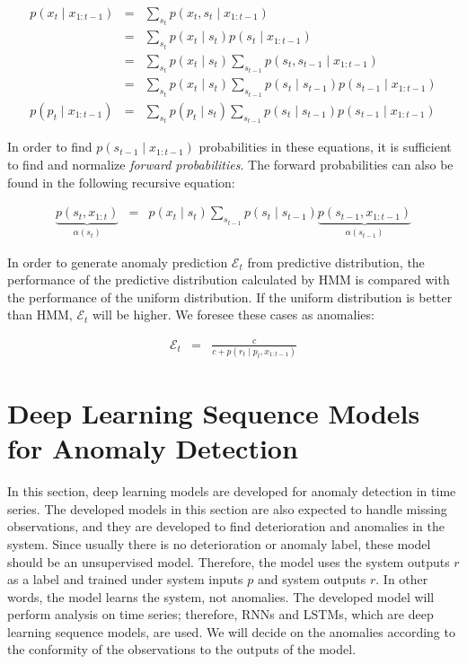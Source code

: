 \begin{eqnarray}
p\left(x_{t} \mid x_{1:t-1}\right) 
& = & \sum_{s_t} p\left(x_t,s_t \mid x_{1:t-1}\right) \\
& = & \sum_{s_t} p\left(x_t \mid s_t\right) p\left(s_t \mid x_{1:t-1}\right) \\
& = & \sum_{s_t} p\left(x_t \mid s_t\right) \sum_{s_{t-1}} p\left(s_t, s_{t-1} \mid x_{1:t-1}\right) \\
& = & \sum_{s_t} p\left(x_t \mid s_t\right) \sum_{s_{t-1}} p\left(s_t \mid s_{t-1}\right) p\left(s_{t-1} \mid x_{1:t-1}\right) \\
p\left(p_{t} \mid x_{1:t-1}\right) 
& = & \sum_{s_t} p\left(p_t \mid s_t\right) \sum_{s_{t-1}} p\left(s_t \mid s_{t-1}\right) p\left(s_{t-1} \mid x_{1:t-1}\right)
\end{eqnarray}

In order to find $ p \left(s_ {t-1} \mid x_ {1: t-1}\right) $ probabilities in these equations, it is sufficient to find and normalize \textit{forward probabilities}. The forward probabilities can also be found in the following recursive equation:

\begin{eqnarray}
\underbrace{p\left(s_t, x_{1:t}\right)}_{\alpha(s_t)} & = & p\left(x_t \mid s_{t}\right) \sum_{s_{t-1}} p\left(s_t \mid s_{t-1}\right) \underbrace{p\left(s_{t-1}, x_{1:t-1}\right)}_{\alpha\left(s_{t-1}\right)}
\end{eqnarray}

In order to generate anomaly prediction $\mathcal{E}_t$ from predictive distribution, the performance of the predictive distribution calculated by HMM is compared with the performance of the uniform distribution. If the uniform distribution is better than HMM, $\mathcal{E}_t$ will be higher. We foresee these cases as anomalies:

\begin{eqnarray}
\mathcal{E}_t & = & \frac{c}{c+p\left(r_{t} \mid p_t, x_{1:t-1}\right)}
\end{eqnarray}

\section{Deep Learning Sequence Models for Anomaly Detection}

In this section, deep learning models are developed for anomaly detection in time series. 
The developed models in this section are also expected to handle missing observations, and they are developed to find deterioration and anomalies in the system. Since usually there is no deterioration or anomaly label, these model should be an unsupervised model. Therefore, the model uses the system outputs $r$ as a label and trained under system inputs $p$ and system outputs $r$. 
In other words, the model learns the system, not anomalies.
The developed model will perform analysis on time series; therefore, RNNs and LSTMs, which are deep learning sequence models, are used. 
We will decide on the anomalies according to the conformity of the observations to the outputs of the model.

